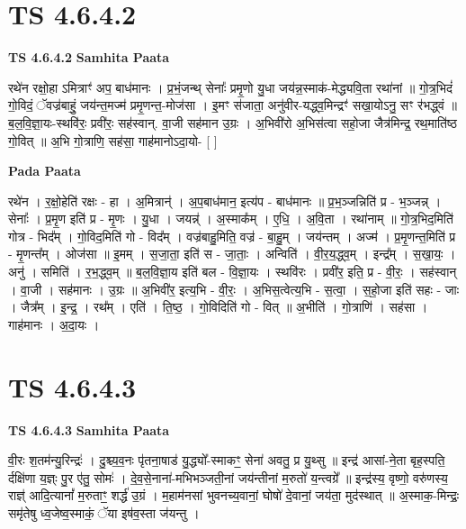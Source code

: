 \documentclass[17pt]{extarticle}
\begin{document}

\section{ TS 4.6.4.2 }

\textbf{TS 4.6.4.2 } \newline
\textbf{Samhita Paata} \newline

रथे॑न रक्षो॒हा ऽमित्राꣳ॑ अप॒ बाध॑मानः । प्र॒भं॒जन्थ् सेनाः᳚ प्रमृ॒णो यु॒धा जय॑न्न॒स्माक॑-मेद्ध्यवि॒ता रथा॑नां ॥ गो॒त्र॒भिदं॑ गो॒विदं॒ ॅवज्र॑बाहुं॒ जय॑न्त॒मज्म॑ प्रमृ॒णन्त॒-मोज॑सा । इ॒मꣳ स॑जाता॒ अनु॑वीर-यद्ध्व॒मिन्द्रꣳ॑ सखा॒योऽनु॒ सꣳ र॑भद्ध्वं ॥ ब॒ल॒वि॒ज्ञा॒यः-स्थवि॑रः॒ प्रवी॑रः॒ सह॑स्वान्. वा॒जी सह॑मान उ॒ग्रः । अ॒भिवी॑रो अ॒भिस॑त्वा सहो॒जा जैत्र॑मिन्द्र॒ रथ॒माति॑ष्ठ गो॒वित् ॥ अ॒भि गो॒त्राणि॒ सह॑सा॒ गाह॑मानोऽदा॒यो- [  ] \newline

\textbf{Pada Paata} \newline

रथे॑न । र॒क्षो॒हेति॑ रक्षः - हा । अ॒मित्रान्॑ । अ॒प॒बाध॑मान॒ इत्य॑प - बाध॑मानः ॥ प्र॒भ॒ञ्जन्निति॑ प्र - भ॒ञ्जन्न् । सेनाः᳚ । प्र॒मृ॒ण इति॑ प्र - मृ॒णः । यु॒धा । जयन्न्॑ । अ॒स्माक᳚म् । ए॒धि॒ । अ॒वि॒ता । रथा॑नाम् ॥ गो॒त्र॒भिद॒मिति॑ गोत्र - भिद᳚म् । गो॒विद॒मिति॑ गो - विद᳚म् । वज्र॑बाहु॒मिति॒ वज्र॑ - बा॒हु॒म् । जय॑न्तम् । अज्म॑ । प्र॒मृ॒णन्त॒मिति॑ प्र - मृ॒णन्त᳚म् । ओज॑सा ॥ इ॒मम् । स॒जा॒ता॒ इति॑ स - जा॒ताः॒ । अन्विति॑ । वी॒र॒य॒द्ध्व॒म् । इन्द्र᳚म् । स॒खा॒यः॒ । अनु॑ । समिति॑ । र॒भ॒द्ध्व॒म् ॥ ब॒ल॒वि॒ज्ञा॒य इति॑ बल - वि॒ज्ञा॒यः । स्थवि॑रः । प्रवी॑र॒ इति॒ प्र - वी॒रः॒ । सह॑स्वान् । वा॒जी । सह॑मानः । उ॒ग्रः ॥ अ॒भिवी॑र॒ इत्य॒भि - वी॒रः॒ । अ॒भिस॒त्वेत्य॒भि - स॒त्वा॒ । स॒हो॒जा इति॑ सहः - जाः । जैत्र᳚म् । इ॒न्द्र॒ । रथ᳚म् । एति॑ । ति॒ष्ठ॒ । गो॒विदिति॑ गो - वित् ॥ अ॒भीति॑ । गो॒त्राणि॑ । सह॑सा । गाह॑मानः । अ॒दा॒यः ।  \newline





\section{ TS 4.6.4.3 }

\textbf{TS 4.6.4.3 } \newline
\textbf{Samhita Paata} \newline

वी॒रः श॒तम॑न्यु॒रिन्द्रः॑ । दु॒श्च्य॒व॒नः पृ॑तना॒षाड॑ यु॒द्ध्यो᳚-स्माकꣳ॒॒ सेना॑ अवतु॒ प्र यु॒थ्सु ॥ इन्द्र॑ आसां-ने॒ता बृह॒स्पति॒ र्दक्षि॑णा य॒ज्ञ्ः पु॒र ए॑तु॒ सोमः॑ । दे॒व॒से॒नाना॑-मभिभञ्जती॒नां जय॑न्तीनां म॒रुतो॑ य॒न्त्वग्रे᳚ ॥ इन्द्र॑स्य॒ वृष्णो॒ वरु॑णस्य॒ राज्ञ्॑ आदि॒त्यानां᳚ म॒रुताꣳ॒॒ शर्द्ध॑ उ॒ग्रं । म॒हाम॑नसां भुवनच्य॒वानां॒ घोषो॑ दे॒वानां॒ जय॑ता॒ मुद॑स्थात् ॥ अ॒स्माक॒-मिन्द्रः॒ समृ॑तेषु ध्व॒जेष्व॒स्माकं॒ ॅया इष॑व॒स्ता ज॑यन्तु । \newline
\end{document}
